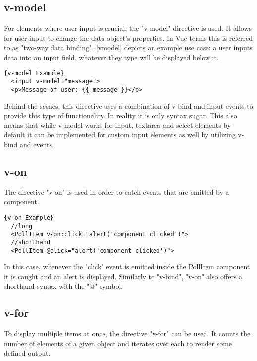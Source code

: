 \subsection{v-model}
For elements where user input is crucial, the "v-model" directive is used. It allows for user input to change the data object's properties. In Vue terms this is referred to as "two-way data binding". \autoref{vmodel} depicts an example use case: a user inputs data into an input field, whatever they type will be displayed below it. \newline

\begin{lstlisting}[caption=v-model Example, captionpos=b, style=htmlcssjs, label=vmodel]{v-model Example}
  <input v-model="message">
  <p>Message of user: {{ message }}</p>
\end{lstlisting}

Behind the scenes, this directive uses a combination of v-bind and input events to provide this type of functionality. In reality it is only syntax sugar. This also means that while v-model works for input, textarea and select elements by default it can be implemented for custom input elements as well by utilizing v-bind and events.

\subsection{v-on}
The directive "v-on" is used in order to catch events that are emitted by a component. \newline

\begin{lstlisting}[caption=v-on Example, captionpos=b, style=htmlcssjs, label=vmodel]{v-on Example}
  //long
  <PollItem v-on:click="alert('component clicked')">
  //shorthand
  <PollItem @click="alert('component clicked')">
\end{lstlisting}

In this case, whenever the "click" event is emitted inside the PollItem component it is caught and an alert is displayed. Similarly to "v-bind", "v-on" also offers a shorthand syntax with the "@" symbol. 

\subsection{v-for}
To display multiple items at once, the directive "v-for" can be used. It counts the number of elements of a given object and iterates over each to render some defined output. \newline

